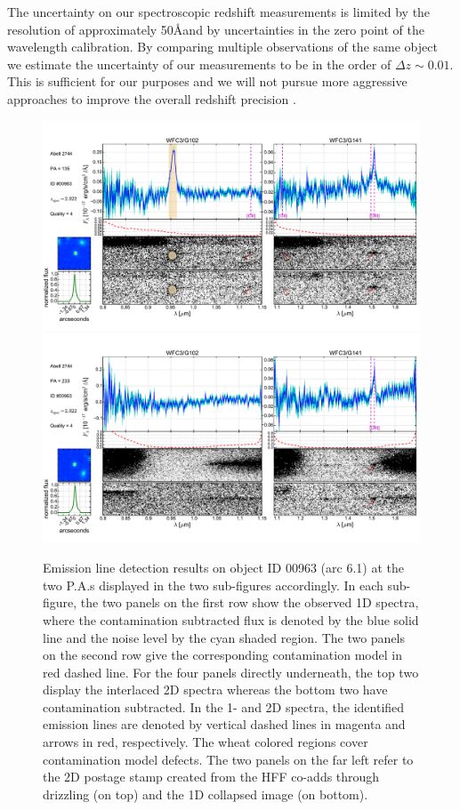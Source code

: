 The uncertainty on our spectroscopic redshift measurements is limited
by the resolution of approximately 50\AA and by uncertainties in the
zero point of the wavelength calibration. By comparing multiple
observations of the same object we estimate the uncertainty of our
measurements to be in the order of $\Delta z\sim 0.01$. This is
sufficient for our purposes and we will not pursue more aggressive
approaches to improve the overall redshift precision
\citep[e.g.][]{Brammer:2012p12977}.

\begin{figure}
    \centering
    \includegraphics[width=.8\textwidth]{fig/clA2744_id963_pa135_zsQ4.pdf}\\
    \includegraphics[width=.8\textwidth]{fig/clA2744_id963_pa233_zsQ4.pdf}
    \caption[Emission line detection results on object ID 00963 (arc 6.1).]
    {Emission line detection results on object ID 00963 (arc 6.1) at the two P.A.s displayed in the two
    sub-figures accordingly. In each sub-figure, the two panels on the first row show the observed 1D
    spectra, where the contamination subtracted flux is denoted by the blue solid line and the noise level by the
    cyan shaded region. The two panels on the second row give the corresponding contamination model in red dashed
    line. For the four panels directly underneath, the top two display the interlaced 2D spectra
    whereas the bottom two have contamination subtracted. In the 1- and 2D spectra, the identified
    emission lines are denoted by vertical dashed lines in magenta and arrows in red, respectively. The wheat
    colored regions cover contamination model defects. 
    The two panels on the far left refer to the 2D postage stamp created from the HFF co-adds through drizzling
    (on top) and the 1D collapsed image (on bottom).
    \label{fig:ELarc6.1}}
\end{figure}

